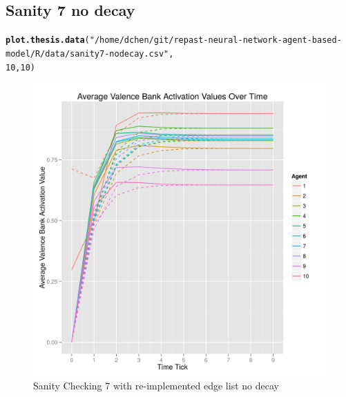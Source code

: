 \documentclass{article}\usepackage[]{graphicx}\usepackage[]{color}
\makeatletter
\def\maxwidth{ %
  \ifdim\Gin@nat@width>\linewidth
    \linewidth
  \else
    \Gin@nat@width
  \fi
}
\newcommand{\hlnum}[1]{\textcolor[rgb]{0.686,0.059,0.569}{#1}}%
\newcommand{\hlstr}[1]{\textcolor[rgb]{0.192,0.494,0.8}{#1}}%
\newcommand{\hlstd}[1]{\textcolor[rgb]{0.345,0.345,0.345}{#1}}%
\newcommand{\hlkwd}[1]{\textcolor[rgb]{0.737,0.353,0.396}{\textbf{#1}}}%
\newenvironment{kframe}{%
 \def\at@end@of@kframe{}%
 \ifinner\ifhmode%
  \def\at@end@of@kframe{\end{minipage}}%
  \begin{minipage}{\columnwidth}%
 \fi\fi%
 \def\FrameCommand##1{\hskip\@totalleftmargin \hskip-\fboxsep
 \colorbox{shadecolor}{##1}\hskip-\fboxsep
     \hskip-\linewidth \hskip-\@totalleftmargin \hskip\columnwidth}%
 \MakeFramed {\advance\hsize-\width
   \@totalleftmargin\z@ \linewidth\hsize
   \@setminipage}}%
 {\par\unskip\endMakeFramed%
 \at@end@of@kframe}
\newenvironment{knitrout}{}{} %
\makeatother
\begin{document}
\subsection{Sanity 7 no decay}
\begin{knitrout}
\color{fgcolor}\begin{kframe}
\begin{alltt}
\hlkwd{plot.thesis.data}\hlstd{(}\hlstr{"/home/dchen/git/repast-neural-network-agent-based-model/R/data/sanity7-nodecay.csv"}\hlstd{,}
    \hlnum{10}\hlstd{,} \hlnum{10}\hlstd{)}
\end{alltt}
\end{kframe}\begin{figure}[]

\includegraphics[width=\maxwidth]{figure/plot-sanity-7-nodecay} \caption[Sanity Checking 7 with re-implemented edge list no decay]{Sanity Checking 7 with re-implemented edge list no decay\label{fig:plot-sanity-7-nodecay}}
\end{figure}


\end{knitrout}


\newpage
\end{document}
